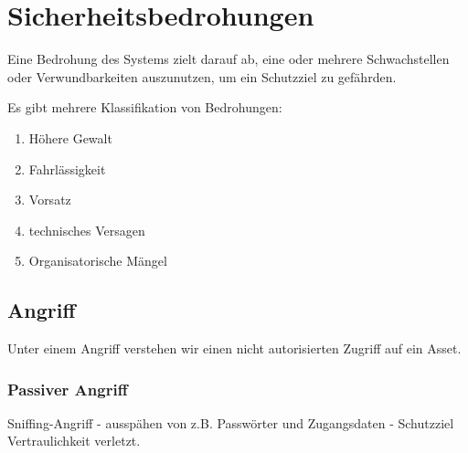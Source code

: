 \documentclass[a4paper]{article}
\title{\docTitle}
\author{Moritz}
\date{\today}
\begin{document}
\maketitle
\tableofcontents


\section{Sicherheitsbedrohungen}


Eine Bedrohung des Systems zielt darauf ab, eine oder mehrere Schwachstellen oder Verwundbarkeiten auszunutzen, um ein Schutzziel zu gefährden.

Es gibt mehrere Klassifikation von Bedrohungen:

\begin{enumerate}
    \item Höhere Gewalt
    \item Fahrlässigkeit
    \item Vorsatz
    \item technisches Versagen
    \item Organisatorische Mängel
\end{enumerate}

\subsection{Angriff}

Unter einem Angriff verstehen wir einen nicht autorisierten Zugriff auf ein Asset.

\subsubsection{Passiver Angriff}

Sniffing-Angriff - ausspähen von z.B. Passwörter und Zugangsdaten - Schutzziel Vertraulichkeit verletzt.
\end{document}
